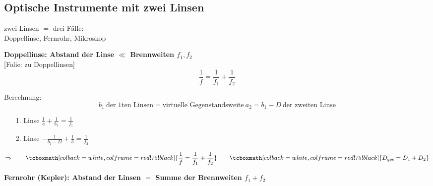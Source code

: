 \documentclass[titlepage,11pt,a4paper,ngerman]{report}
\newcommand{\tx}[1]{\textrm{#1}}
\newcommand{\folie}[1]{\color{gray}[Folie: #1]\color{black}}
\newcommand{\rmbox}[1]{\tcboxmath[colback=white,colframe=red!75!black]{#1}}
\begin{document}
\subsection{Optische Instrumente mit zwei Linsen}

zwei Linsen $ = $ drei Fälle:\\[5pt]
Doppellinse, Fernrohr, Mikroskop\\[5pt]
\begin{enumerate}[1)]
	\begin{minipage}{.7\linewidth}
		\item \textbf{Doppellinse: Abstand der Linse $ \ll $ Brennweiten $ f_1,f_2 $}\\
		\folie{zu Doppellinsen}
		\begin{equation*}
		\frac{1}{f} = \frac{1}{f_1} + \frac{1}{f_2}
		\end{equation*}
	\end{minipage}
	\begin{minipage}{.3\linewidth}
		\centering
	\end{minipage}
	Berechnung:
	\begin{equation*}
	b_1 \ \tx{der 1ten Linsen} = \tx{virtuelle Gegenstandsweite} \ a_2 = b_1 - D \ \tx{der zweiten Linse}
	\end{equation*}
	\begin{itemize}
		\item[1. Linse] $ \frac{1}{a} + \frac{1}{b_1} = \frac{1}{f_1} $
		\item[2. Linse] $ -\frac{1}{b_1 - D} + \frac{1}{b} = \frac{1}{f_2} $
	\end{itemize}
	\begin{equation*}
	\Rightarrow \qquad \rmbox{\frac{1}{f} = \frac{1}{f_1} + \frac{1}{f_2}} \qquad \rmbox{D_{\tx{ges}} = D_1 + D_2}
	\end{equation*}
	\item \textbf{Fernrohr (Kepler): Abstand der Linsen $ = $ Summe der Brennweiten $ f_1 + f_2 $}\\

\end{enumerate}
\end{document}

